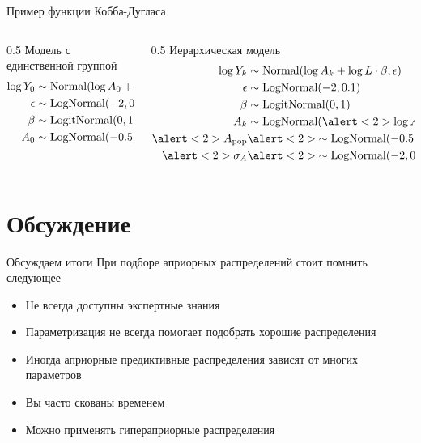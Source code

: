 \documentclass{beamer}
\begin{document}
\begin{frame}{Пример функции Кобба-Дугласа}
    \begin{columns}[t]
    \begin{column}{0.5\linewidth}
    Модель с единственной группой
     \begin{align*}
        \log Y_0 &\sim \operatorname{Normal}(\log A_0 + \log L \cdot \beta, {\epsilon})\\
        {\epsilon} &\sim \operatorname{LogNormal}(-2, 0.1)\\
        \beta &\sim \operatorname{LogitNormal}(0, 1)\\
        A_0 &\sim \operatorname{LogNormal}(-0.5, 0.1)\\
    \end{align*}
    \end{column}
    \begin{column}{0.5\linewidth}
    Иерархическая модель
    \begin{align*}
        \log Y_k &\sim \operatorname{Normal}(\log A_k + \log L \cdot \beta, \eps)\\
        \eps &\sim \operatorname{LogNormal}(-2, 0.1)\\
        \beta &\sim \operatorname{LogitNormal}(0, 1)\\
        A_k &\sim \operatorname{LogNormal}(\alert<2>{\log A_{\text{pop}}}, \alert<2>{\sigma_A})\\
        \alert<2>{A_{\text{pop}}}&\alert<2>{\sim \operatorname{LogNormal}(-0.5, 0.1)}\\
        \alert<2>{\sigma_A}&\alert<2>{\sim \operatorname{LogNormal}(-2, 0.1)}
    \end{align*}
    \end{column}
    \end{columns}
\end{frame}
\section{Обсуждение}
\begin{frame}{Обсуждаем итоги}
При подборе априорных распределений стоит помнить следующее
    \begin{itemize}
        \item Не всегда доступны экспертные знания
        \item Параметризация не всегда помогает подобрать хорошие распределения
        \item Иногда априорные предиктивные распределения зависят от многих параметров
        \item Вы часто скованы временем
        \item Можно применять гипераприорные распределения
    \end{itemize}
\end{frame}
\end{document}
